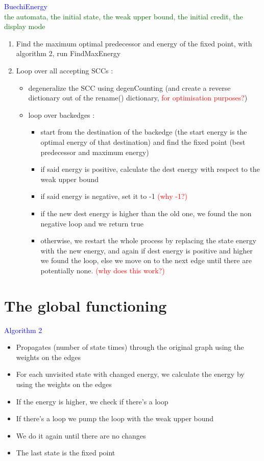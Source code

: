 \documentclass{rapport}
\begin{document}
\textcolor{blue}{BuechiEnergy}\\
\textcolor[HTML]{006400}{the automata, the initial state, the weak upper bound, the initial credit, the display mode}
\begin{enumerate}
    \item Find the maximum optimal predecessor and energy of the fixed point, with algorithm 2, run FindMaxEnergy
    \item Loop over all accepting SCCs :
    \begin{itemize}
        \item degeneralize the SCC using degenCounting (and create a reverse dictionary out of the rename() dictionary, \textcolor{red}{for optimisation purposes?})
        \item loop over backedges :
        \begin{itemize}
            \item start from the destination of the backedge (the start energy is the optimal energy of that destination) and find the fixed point (best predecessor and maximum energy)
            \item if said energy is positive, calculate the dest energy with respect to the weak upper bound 
            \item if said energy is negative, set it to -1 \textcolor{red}{(why -1?)}
            \item if the new dest energy is higher than the old one, we found the non negative loop and we return true
            \item otherwise, we restart the whole process by replacing the state energy with the new energy, and again if dest energy is positive and  higher we found the loop, else we move on to the next edge until there are potentially none. \textcolor{red}{(why does this work?)} 
        \end{itemize}
    \end{itemize}
\end{enumerate}

\newpage

\section{The global functioning}

\textcolor{blue}{Algorithm 2}\\
\begin{itemize}
    \item Propagates (number of state times) through the original graph using the weights on the edges
    \item For each unvisited state with changed energy, we calculate the energy by using the weights on the edges
    \item If the energy is higher, we check if there’s a loop
    \item If there’s a loop we pump the loop with the weak upper bound
    \item We do it again until there are no changes
    \item The last state is the fixed point
\end{itemize}
\end{document}
